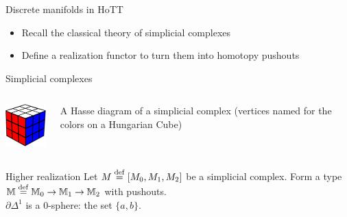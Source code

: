 \documentclass[14pt,aspectratio=169]{beamer}
\begin{document}
\begin{frame}{Discrete manifolds in HoTT}
\begin{itemize}
\item Recall the classical theory of \alert{simplicial complexes}
\item Define a \alert{realization} functor to turn them into homotopy pushouts
\end{itemize}
\end{frame}

\begin{frame}{Simplicial complexes}
\begin{columns}
\begin{column}{0.5\textwidth}
\!\!\!\!\!\vspace{-0.5cm}\resizebox{220pt}{!}{
\begin{tikzpicture}[scale=0.1]

\end{tikzpicture}%
}
\resizebox{90pt}{!}{%

}
\quad
\includegraphics[width=60pt]{figs/hungarian_cube.pdf}
\end{column}
\begin{column}{0.5\textwidth}
A \alert{Hasse diagram} of a simplicial complex (vertices named for the colors on a Hungarian Cube)
\end{column}
\end{columns}
\end{frame}

\begin{frame}{Higher realization}
Let \( M\stackrel{\mathrm{def}}{=} [M_0,M_1,M_2] \) be a simplicial complex. Form a type \( \mathbb{M}\stackrel{\mathrm{def}}{=} \mathbb{M}_0\to\mathbb{M}_1\to\mathbb{M}_2 \) with pushouts.
\[\]
\( \partial\Delta^1 \) is a 0-sphere: the set \( \{a, b\} \).
\end{frame}
\end{document}
